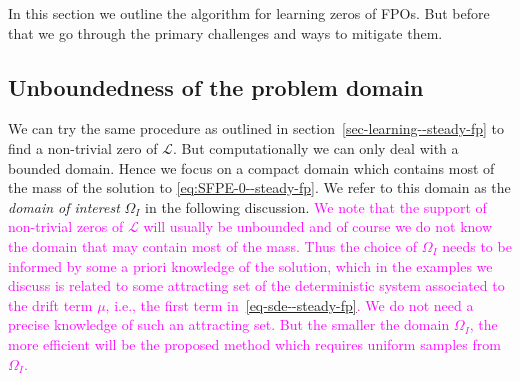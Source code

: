 In this section we outline the algorithm for learning zeros of FPOs. But before that we go through the primary challenges and ways to mitigate them.

\subsection{Unboundedness of the problem domain}\label{ssec-unbounded-domain--steady-fp} We can try the same procedure as outlined in section~\ref{sec-learning--steady-fp} to find a non-trivial zero of $\mathcal L$. But computationally we can only deal with a bounded domain. Hence we focus on a compact domain which contains most of the mass of the solution to \eqref{eq:SFPE-0--steady-fp}. We refer to this domain as the \textit{domain of interest} $\Omega_I$ in the following discussion. \textcolor{magenta}{We note that the support of non-trivial zeros of $\mathcal L$ will usually be unbounded and of course we do not know the domain that may contain most of the mass. Thus the choice of $\Omega_I$ needs to be informed by some a priori knowledge of the solution, which in the examples we discuss is related to some attracting set of the deterministic system associated to the drift term $\mu$, i.e., the first term in~\eqref{eq-sde--steady-fp}. We do not need a precise knowledge of such an attracting set. But the smaller the domain $\Omega_I$, the more efficient will be the proposed method which requires uniform samples from $\Omega_I$.}


